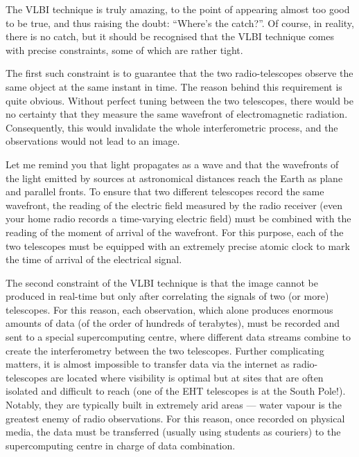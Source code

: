 The VLBI technique is truly amazing, to the point of appearing almost too good to be
true, and thus raising the doubt: ``Where's the catch?''. Of course, in reality, there
is no catch, but it should be recognised that the VLBI technique comes with precise
constraints, some of which are rather tight.

The first such constraint is to guarantee that the two radio-telescopes observe the same
object at the same instant in time. The reason behind this requirement is quite obvious.
Without perfect tuning between the two telescopes, there would be no certainty that they
measure the same wavefront of electromagnetic radiation.
Consequently, this would invalidate the whole interferometric process, and the
observations would not lead to an image.

Let me remind you that light propagates as a wave and that the wavefronts of the light
emitted by sources at astronomical distances reach the Earth as plane and parallel
fronts. To ensure that two different telescopes record the same wavefront, the reading
of the electric field measured by the radio receiver (even your home radio records a
time-varying electric field) must be combined with the reading of the moment of arrival
of the wavefront. For this purpose, each of the two telescopes must be equipped with an
extremely precise atomic clock to mark the time of arrival of the
electrical signal.

The second constraint of the VLBI technique is that the image cannot be produced in
real-time but only after correlating the signals of two (or more) telescopes. For this
reason, each observation, which alone produces enormous amounts of data (of the order of
hundreds of terabytes), must be recorded and sent to a special supercomputing centre,
where different data streams combine to create the interferometry between the two
telescopes. Further complicating matters, it is almost impossible to transfer data via
the internet as radio-telescopes are located where visibility is optimal but at sites
that are often isolated and difficult to reach (one of the EHT telescopes is at the
South Pole!). Notably, they are typically built in extremely arid areas --- water
vapour is the greatest enemy of radio observations. For this reason,
once recorded on physical media, the data must be transferred (usually using students as
couriers) to the supercomputing centre in charge of data combination.

